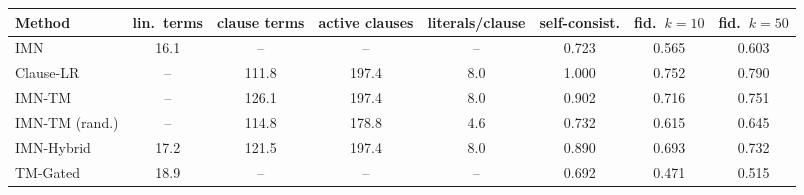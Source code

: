 \begin{tabular}{lccccccc}
\toprule
Method & lin.\ terms & clause terms & active clauses & literals/clause & self-consist. & fid.\ $k{=}10$ & fid.\ $k{=}50$ \\
\midrule
IMN & 16.1 & -- & -- & -- & 0.723 & 0.565 & 0.603 \\
Clause-LR & -- & 111.8 & 197.4 & 8.0 & 1.000 & 0.752 & 0.790 \\
IMN-TM & -- & 126.1 & 197.4 & 8.0 & 0.902 & 0.716 & 0.751 \\
IMN-TM (rand.) & -- & 114.8 & 178.8 & 4.6 & 0.732 & 0.615 & 0.645 \\
IMN-Hybrid & 17.2 & 121.5 & 197.4 & 8.0 & 0.890 & 0.693 & 0.732 \\
TM-Gated & 18.9 & -- & -- & -- & 0.692 & 0.471 & 0.515 \\
\bottomrule
\end{tabular}

